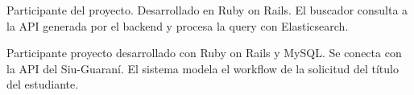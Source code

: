 \divider

Participante del proyecto. Desarrollado en Ruby on Rails. El buscador consulta a la API generada por el backend y procesa la query con Elasticsearch. 

\divider

Participante proyecto  desarrollado con Ruby on Rails y MySQL. Se conecta con la API del Siu-Guaraní. El sistema modela el workflow de la solicitud del título del estudiante.

\divider

